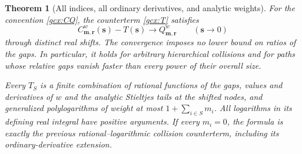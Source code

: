 \documentclass[11pt]{article}
\numberwithin{equation}{section}
\theoremstyle{plain}
\newtheorem{theorem}{Theorem}[section]
\theoremstyle{definition}
\theoremstyle{remark}
\begin{document}
\begin{theorem}[All indices, all ordinary derivatives, and analytic weights]
\label{gcx:main}
For the convention \eqref{gcx:CQ}, the counterterm \eqref{gcx:T} satisfies
\begin{equation}\label{gcx:limit}
 C_{\boldsymbol m,\boldsymbol r}^{w}(\boldsymbol s)
       -T(\boldsymbol s)
       \longrightarrow Q_{\boldsymbol m,\boldsymbol r}^{w}
 \qquad (\boldsymbol s\longrightarrow0)
\end{equation}
through distinct real shifts.  The convergence imposes no lower bound on
ratios of the gaps.  In particular, it holds for arbitrary hierarchical
collisions and for paths whose relative gaps vanish faster than every
power of their overall size.

Every $T_S$ is a finite combination of rational functions of the gaps,
values and derivatives of $w$ and the analytic Stieltjes tails at the
shifted nodes, and generalized polylogarithms of weight at most
$1+\sum_{i\in S}m_i$.  All logarithms in its defining real integral have
positive arguments.  If every $m_i=0$, the formula is exactly the
previous rational--logarithmic collision counterterm, including its
ordinary-derivative extension.
\end{theorem}
\end{document}
